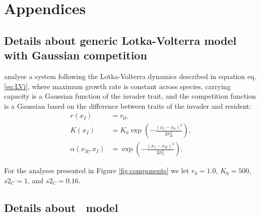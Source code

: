 \documentclass[a4paper,11pt]{article}
\begin{document}



\clearpage
\setcounter{secnumdepth}{2}

\section{Appendices}

\subsection{Details about generic Lotka-Volterra model with
Gaussian competition}\label{sec:DD99}

\citet{Dieckmann-1999} analyse a system following the Lotka-Volterra dynamics
described in equation eq. \ref{eq:LVi}, where maximum growth rate is constant
across species, carrying capacity is a Gaussian
function of the invader trait, and the competition function is a Gaussian
based on the difference between traits of the invader and resident:
\begin{subequations}
\begin{align}
\label{eq:DD}
r(x_I) &= r_0, \\
K(x_I) &= K_0 \exp\left(-\frac{\left(x_I-x_0\right)^2}{2\sigma^2_K}\right),\\
\alpha(x_R, x_I) &= \exp\left(-\frac{\left(x_I-x_R\right)^2}{2\sigma^2_C}\right).
\end{align}
\end{subequations}

For the analyses presented in Figure \ref{fig:components} we let $r_0=1.0$, $K_0=500$,
 $s2_C=1$, and $s2_C=0.16$.

\subsection{Details about \Rstar\ model}\label{sec:Rstar}
\end{document}
